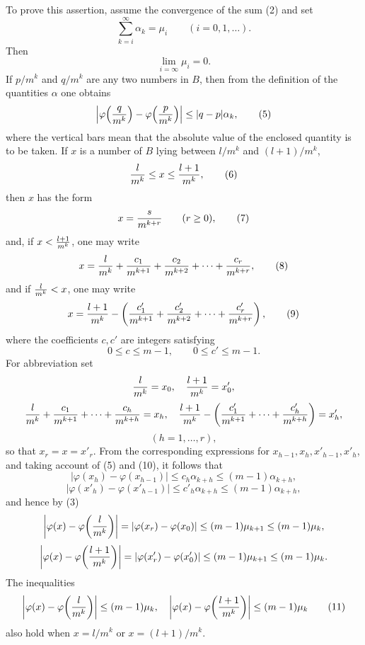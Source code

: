To prove this assertion, assume the convergence of the sum (2) and set
\begin{equation}
 \sum_{k=i}^{\infty}\alpha_k=\mu_i\qquad (i=0,1,\ldots).
\tag{3}
\end{equation}
Then
\begin{equation}
 \lim_{i=\infty}\mu_i=0.
\tag{4}
\end{equation}
If $p/m^k$ and $q/m^k$ are any two numbers in $B$, then from the definition of the quantities $\alpha$ one obtains
\begin{equation}
 \left|\varphi\!\left({q\over m^k}\right)-\varphi\!\left({p\over m^k}\right)\right|\le |q-p|\alpha_k,
\tag{5}
\end{equation}
where the vertical bars mean that the absolute value of the enclosed quantity is to be taken. If $x$ is a number of $B$ lying between $l/m^k$ and $(l+1)/m^k$,
\begin{equation}
 {l\over m^k}\le x\le {l+1\over m^k},
\tag{6}
\end{equation}
then $x$ has the form
\begin{equation}
 x={s\over m^{k+r}}\qquad (r\ge0),
\tag{7}
\end{equation}
and, if $x<{l+1\over m^k}$, one may write
\begin{equation}
 x={l\over m^k}+{c_1\over m^{k+1}}+{c_2\over m^{k+2}}+\cdots+{c_r\over m^{k+r}},
\tag{8}
\end{equation}
and if ${l\over m^k}<x$, one may write
\begin{equation}
 x={l+1\over m^k}-\left({c'_1\over m^{k+1}}+{c'_2\over m^{k+2}}+\cdots+{c'_r\over m^{k+r}}\right),
\tag{9}
\end{equation}
where the coefficients $c,c'$ are integers satisfying
\begin{equation}
 0\le c\le m-1,
 \qquad
 0\le c'\le m-1.
\tag{10}
\end{equation}
For abbreviation set
\[
 {l\over m^k}=x_0,
 \quad
 {l+1\over m^k}=x'_0,
\]
\[
 {l\over m^k}+{c_1\over m^{k+1}}+\cdots+{c_h\over m^{k+h}}=x_h,
 \quad
 {l+1\over m^k}-\left({c'_1\over m^{k+1}}+\cdots+{c'_h\over m^{k+h}}\right)=x'_h,
\]
\[
 (h=1,\ldots,r),
\]
so that $x_r=x=x'_r$. From the corresponding expressions for $x_{h-1},x_h,x'_{h-1},x'_h$, and taking account of (5) and (10), it follows that
\[
 \left|\varphi(x_h)-\varphi(x_{h-1})\right|\le c_h\alpha_{k+h}\le(m-1)\alpha_{k+h},
\]
\[
 \left|\varphi(x'_h)-\varphi(x'_{h-1})\right|\le c'_h\alpha_{k+h}\le(m-1)\alpha_{k+h},
\]
and hence by (3)
\[
 \left|\varphi(x)-\varphi\!\left({l\over m^k}\right)\right|=|\varphi(x_r)-\varphi(x_0)|\le(m-1)\mu_{k+1}\le(m-1)\mu_k,
\]
\[
 \left|\varphi(x)-\varphi\!\left({l+1\over m^k}\right)\right|=|\varphi(x'_r)-\varphi(x'_0)|\le(m-1)\mu_{k+1}\le(m-1)\mu_k.
\]
The inequalities
\begin{equation}
 \left|\varphi(x)-\varphi\!\left({l\over m^k}\right)\right|\le(m-1)\mu_k,
 \quad
 \left|\varphi(x)-\varphi\!\left({l+1\over m^k}\right)\right|\le(m-1)\mu_k
\tag{11}
\end{equation}
also hold when $x=l/m^k$ or $x=(l+1)/m^k$.

